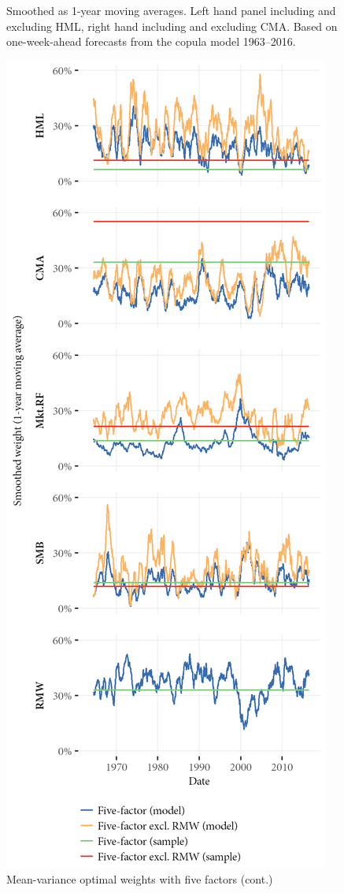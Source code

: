 \begin{figure}[htbp]
  \begin{longcaption}
    Smoothed as 1-year moving averages. Left hand panel including and excluding HML, right hand including and excluding CMA. Based on one-week-ahead forecasts from the copula model 1963--2016.
  \end{longcaption}
\end{figure}

\begin{figure}[htbp]
  \ContinuedFloat
  \centering
  \includegraphics[scale=1]{graphics/weights/main_Weights_MV_5F_5F_EXCL_RMW.png}
  \footnotesize
  \caption{Mean-variance optimal weights with five factors (cont.)}
\end{figure}

